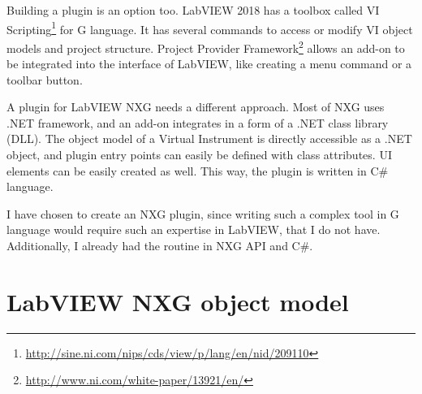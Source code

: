 Building a plugin is an option too. LabVIEW 2018 has a toolbox called VI Scripting\footnote{\url{http://sine.ni.com/nips/cds/view/p/lang/en/nid/209110}} for G language. It has several commands to access or modify VI object models and project structure. Project Provider Framework\footnote{\url{http://www.ni.com/white-paper/13921/en/}} allows an add-on to be integrated into the interface of LabVIEW, like creating a menu command or a toolbar button.

A plugin for LabVIEW NXG needs a different approach. Most of NXG uses .NET framework, and an add-on integrates in a form of a .NET class library (DLL). The object model of a Virtual Instrument is directly accessible as a .NET object, and plugin entry points can easily be defined with class attributes. UI elements can be easily created as well. This way, the plugin is written in C\# language.

I have chosen to create an NXG plugin, since writing such a complex tool in G language would require such an expertise in LabVIEW, that I do not have. Additionally, I already had the routine in NXG API and C\#.
\section{LabVIEW NXG object model}
